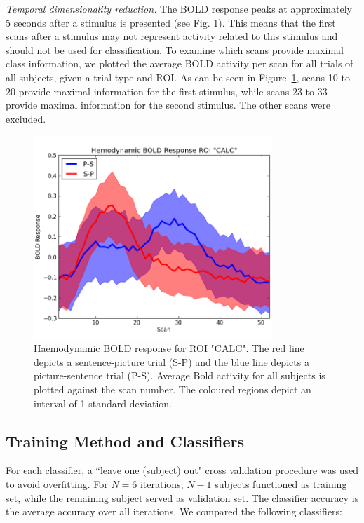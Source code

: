 \documentclass[preprint,journal,11pt]{vgtc}
\begin{document}
\emph{Temporal dimensionality reduction.} The BOLD response peaks at approximately 5 seconds after a stimulus is presented (see Fig. 1). This means that the first scans after a stimulus may not represent activity related to this stimulus and should not be used for classification. To examine which scans provide maximal class information, we plotted the average BOLD activity per scan for all trials of all subjects, given a trial type and ROI. As can be seen in Figure~\ref{fig:boldroi}, scans 10 to 20 provide maximal information for the first stimulus, while scans 23 to 33 provide maximal information for the second stimulus. The other scans were excluded.      
\begin{figure}
	\centering
	\includegraphics[width=90mm]{figures/scan_hemodynamic_BOLD_roi}
  	\caption{Haemodynamic BOLD response for ROI "CALC". The red line depicts a sentence-picture trial (S-P) and the blue line depicts a picture-sentence trial (P-S). Average Bold activity for all subjects is plotted against the scan number. The coloured regions depict an interval of 1 standard deviation.}
  	\label{fig:boldroi}
\end{figure}

\subsection{Training Method and Classifiers}
\label{sec:trainingMethodsAndClassifiers}

For each classifier, a ``leave one (subject) out" cross validation procedure was used to avoid overfitting. For $N=6$ iterations, $N-1$ subjects functioned as training set, while the remaining subject served as validation set. The classifier accuracy is the average accuracy over all iterations. 
We compared the following classifiers:
\end{document}

